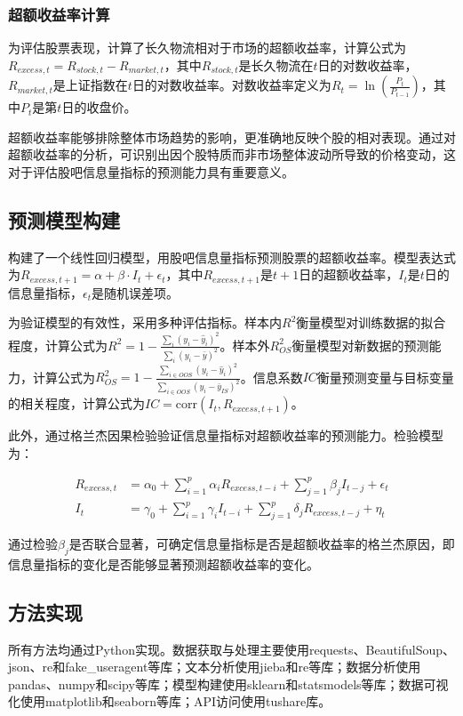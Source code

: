 \documentclass[12pt, a4paper]{article}
\begin{document}
\subsubsection{超额收益率计算}
为评估股票表现，计算了长久物流相对于市场的超额收益率，计算公式为$R_{excess,t} = R_{stock,t} - R_{market,t}$，其中$R_{stock,t}$是长久物流在$t$日的对数收益率，$R_{market,t}$是上证指数在$t$日的对数收益率。对数收益率定义为$R_{t} = \ln\left(\frac{P_t}{P_{t-1}}\right)$，其中$P_t$是第$t$日的收盘价。

超额收益率能够排除整体市场趋势的影响，更准确地反映个股的相对表现。通过对超额收益率的分析，可识别出因个股特质而非市场整体波动所导致的价格变动，这对于评估股吧信息量指标的预测能力具有重要意义。

\subsection{预测模型构建}
构建了一个线性回归模型，用股吧信息量指标预测股票的超额收益率。模型表达式为$R_{excess,t+1} = \alpha + \beta \cdot I_t + \epsilon_t$，其中$R_{excess,t+1}$是$t+1$日的超额收益率，$I_t$是$t$日的信息量指标，$\epsilon_t$是随机误差项。

为验证模型的有效性，采用多种评估指标。样本内$R^2$衡量模型对训练数据的拟合程度，计算公式为$R^2 = 1 - \frac{\sum_{i}(y_i - \hat{y}_i)^2}{\sum_{i}(y_i - \bar{y})^2}$。样本外$R^2_{OS}$衡量模型对新数据的预测能力，计算公式为$R^2_{OS} = 1 - \frac{\sum_{i \in OOS}(y_i - \hat{y}_i)^2}{\sum_{i \in OOS}(y_i - \bar{y}_{IS})^2}$。信息系数$IC$衡量预测变量与目标变量的相关程度，计算公式为$IC = \text{corr}(I_t, R_{excess,t+1})$。

此外，通过格兰杰因果检验验证信息量指标对超额收益率的预测能力。检验模型为：

\begin{equation}
\begin{aligned}
R_{excess,t} &= \alpha_0 + \sum_{i=1}^p \alpha_i R_{excess,t-i} + \sum_{j=1}^p \beta_j I_{t-j} + \epsilon_t \\
I_t &= \gamma_0 + \sum_{i=1}^p \gamma_i I_{t-i} + \sum_{j=1}^p \delta_j R_{excess,t-j} + \eta_t
\end{aligned}
\end{equation}

通过检验$\beta_j$是否联合显著，可确定信息量指标是否是超额收益率的格兰杰原因，即信息量指标的变化是否能够显著预测超额收益率的变化。

\subsection{方法实现}
所有方法均通过Python实现。数据获取与处理主要使用requests、BeautifulSoup、json、re和fake\_useragent等库；文本分析使用jieba和re等库；数据分析使用pandas、numpy和scipy等库；模型构建使用sklearn和statsmodels等库；数据可视化使用matplotlib和seaborn等库；API访问使用tushare库。
\end{document}
